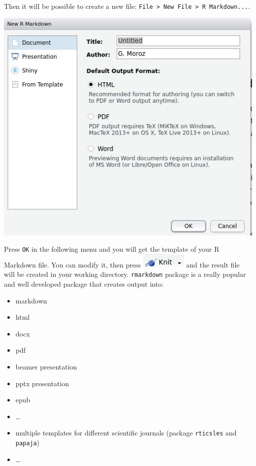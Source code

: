\documentclass[
]{book}
\providecommand{\tightlist}{%
  \setlength{\itemsep}{0pt}\setlength{\parskip}{0pt}}
\begin{document}
Then it will be possible to create a new file: \texttt{File\ \textgreater{}\ New\ File\ \textgreater{}\ R\ Markdown...}.

\includegraphics{images/01.06.rmarkdown.png}

Press \texttt{OK} in the following menu and you will get the template of your R Markdown file. You can modify it, then press \includegraphics{images/01.07.knit.png} and the result file will be created in your working directory. \texttt{rmarkdown} package is a really popular and well developed package that creates output into:

\begin{itemize}
\tightlist
\item
  markdown
\item
  html
\item
  docx
\item
  pdf
\item
  beamer presentation
\item
  pptx presentation
\item
  epub
\item
  \ldots{}
\item
  multiple templates for different scientific journals (package \texttt{rticsles} and \texttt{papaja})
\item
  \ldots{}
\end{itemize}
\end{document}
